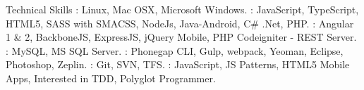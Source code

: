 \documentclass{resume}
\author{Rahmathullah M}
\begin{document}
\maketitle



\begin{category}{Technical Skills}
  : Linux, Mac OSX, Microsoft Windows.
  : JavaScript, TypeScript, HTML5, SASS with SMACSS, NodeJs, Java-Android, C\# .Net, PHP.
  : Angular 1 \& 2, BackboneJS, ExpressJS, jQuery Mobile, PHP Codeigniter - REST Server.
  : MySQL, MS SQL Server.
  : Phonegap CLI, Gulp, webpack, Yeoman, Eclipse, Photoshop, Zeplin.
  : Git, SVN, TFS.
  : JavaScript, JS Patterns, HTML5 Mobile Apps, Interested in TDD, Polyglot Programmer.
\end{category} 

\end{document}
